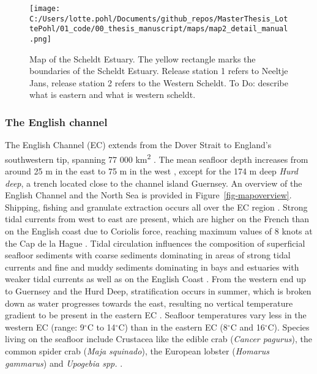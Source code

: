 \documentclass[
  authoryear,
  review,
  3p]{elsarticle}
\begin{document}
\begin{figure}

{\centering \texttt{[image: C:/Users/lotte.pohl/Documents/github\_repos/MasterThesis\_LottePohl/01\_code/00\_thesis\_manuscript/maps/map2\_detail\_manual.png]}

}

\caption{\label{fig-mapdetail}Map of the Scheldt Estuary. The yellow
rectangle marks the boundaries of the Scheldt Estuary. Release station 1
refers to Neeltje Jans, release station 2 refers to the Western Scheldt.
To Do: describe what is eastern and what is western scheldt.}

\end{figure}

\hypertarget{sec-mmstudyareaec}{%
\subsubsection{The English channel}\label{sec-mmstudyareaec}}

The English Channel (EC) extends from the Dover Strait to England's
southwestern tip, spanning 77 000 km\textsuperscript{2}
\citep{dauvin_2012}. The mean seafloor depth increases from around 25 m
in the east to 75 m in the west \citep{dauvin_2012}, except for the 174
m deep \emph{Hurd deep}, a trench located close to the channel island
Guernsey. An overview of the English Channel and the North Sea is
provided in Figure~\ref{fig-mapoverview}. Shipping, fishing and
granulate extraction occurs all over the EC region \citep{dauvin_2015}.
Strong tidal currents from west to east are present, which are higher on
the French than on the English coast due to Coriolis force, reaching
maximum values of 8 knots at the Cap de la Hague \citep{salomon_1993}.
Tidal circulation influences the composition of superficial seafloor
sediments with coarse sediments dominating in areas of strong tidal
currents and fine and muddy sediments dominating in bays and estuaries
with weaker tidal currents as well as on the English Coast
\citep{larsonneur_1982}. From the western end up to Guernsey and the
Hurd Deep, stratification occurs in summer, which is broken down as
water progresses towards the east, resulting no vertical temperature
gradient to be present in the eastern EC \citep{holme_1966}. Seafloor
temperatures vary less in the western EC (range: 9\(^\circ\)C to
14\(^\circ\)C) than in the eastern EC (8\(^\circ\)C and 16\(^\circ\)C).
Species living on the seafloor include Crustacea like the edible crab
(\emph{Cancer pagurus}), the common spider crab (\emph{Maja squinado}),
the European lobster (\emph{Homarus gammarus}) and \emph{Upogebia spp.}
\citep{holme_1966, vaz_2007}.
\end{document}
